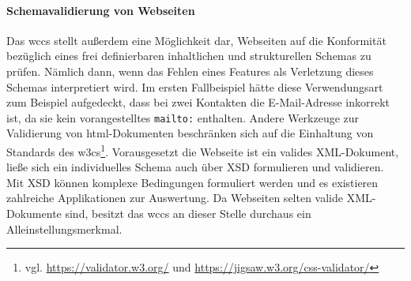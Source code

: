         \paragraph{Schemavalidierung von Webseiten}
        Das \gls{wccs} stellt außerdem eine Möglichkeit dar,
        Webseiten auf die Konformität bezüglich eines frei definierbaren
        inhaltlichen und strukturellen Schemas zu prüfen.
        Nämlich dann, wenn das Fehlen eines Features als Verletzung
        dieses Schemas interpretiert wird.
        Im ersten Fallbeispiel hätte diese Verwendungsart zum Beispiel aufgedeckt,
        dass bei zwei Kontakten die E-Mail-Adresse inkorrekt ist,
        da sie kein vorangestelltes \texttt{mailto:} enthalten.
        Andere Werkzeuge zur Validierung von \gls{html}-Dokumenten
        beschränken sich auf die Einhaltung von Standards des
        \glspl{w3c}\footnote{vgl. \url{https://validator.w3.org/} und \url{https://jigsaw.w3.org/css-validator/}}.
        Vorausgesetzt die Webseite ist ein valides XML-Dokument,
        ließe sich ein individuelles Schema auch über XSD formulieren und validieren.
        Mit XSD können komplexe Bedingungen formuliert werden und es existieren
        zahlreiche Applikationen zur Auswertung.
        Da Webseiten selten valide XML-Dokumente sind,
        besitzt das \gls{wccs} an dieser Stelle durchaus
        ein Alleinstellungsmerkmal.
